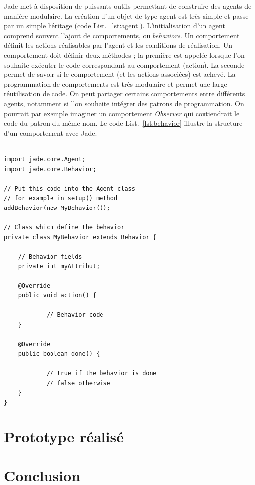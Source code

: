 \documentclass[conference]{IEEEtran}
\begin{document}
Jade met à disposition de puissants outils permettant de construire des agents de manière modulaire. La création d'un objet de type agent est très simple et passe par un simple héritage (code List.~\ref{lst:agent}). L'initialisation d'un agent comprend souvent l'ajout de comportements, ou \textit{behaviors}. Un comportement définit les actions réalisables par l'agent et les conditions de réalisation. Un comportement doit définir deux méthodes ; la première est appelée lorsque l'on souhaite exécuter le code correspondant au comportement (action). La seconde permet de savoir si le comportement (et les actions associées) est achevé. La programmation de comportements est très modulaire et permet une large réutilisation de code. On peut partager certains comportements entre différents agents, notamment si l'on souhaite intégrer des patrons de programmation. On pourrait par exemple imaginer un comportement \textit{Observer} qui contiendrait le code du patron du même nom. Le code List.~\ref{lst:behavior} illustre la structure d'un comportement avec Jade.\\

\begin{lstlisting}[caption=Agents et comportements, label=lst:behavior]

import jade.core.Agent;
import jade.core.Behavior;

// Put this code into the Agent class
// for example in setup() method
addBehavior(new MyBehavior());

// Class which define the behavior
private class MyBehavior extends Behavior {

    // Behavior fields
    private int myAttribut;
    
    @Override
    public void action() {
    
            // Behavior code
    }
    
    @Override
    public boolean done() {
    
            // true if the behavior is done
            // false otherwise
    }
}
\end{lstlisting}

\section{Prototype réalisé}

\section{Conclusion}
\end{document}
